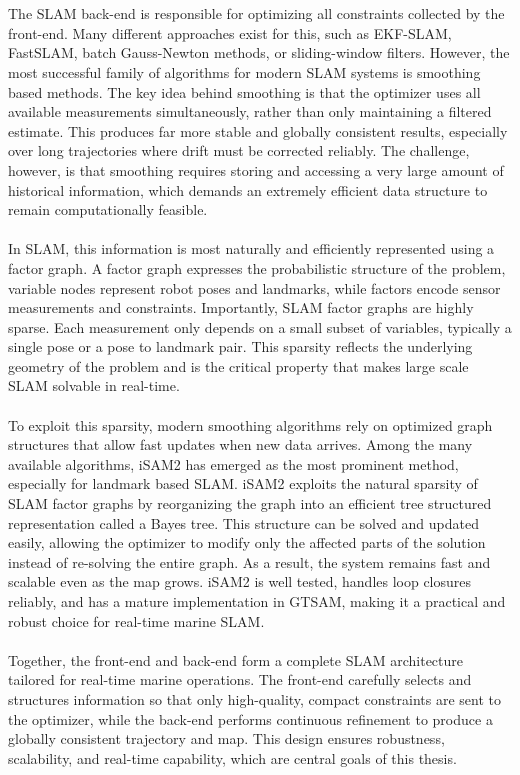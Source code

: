 \\ \\
The SLAM back-end is responsible for optimizing all constraints collected by the front-end. Many different approaches exist for this, such as EKF-SLAM, FastSLAM, batch Gauss-Newton methods, or sliding-window filters. However, the most successful family of algorithms for modern SLAM systems is smoothing based methods. The key idea behind smoothing is that the optimizer uses all available measurements simultaneously, rather than only maintaining a filtered estimate. This produces far more stable and globally consistent results, especially over long trajectories where drift must be corrected reliably. The challenge, however, is that smoothing requires storing and accessing a very large amount of historical information, which demands an extremely efficient data structure to remain computationally feasible.
\\ \\
In SLAM, this information is most naturally and efficiently represented using a factor graph. A factor graph expresses the probabilistic structure of the problem, variable nodes represent robot poses and landmarks, while factors encode sensor measurements and constraints. Importantly, SLAM factor graphs are highly sparse. Each measurement only depends on a small subset of variables, typically a single pose or a pose to landmark pair. This sparsity reflects the underlying geometry of the problem and is the critical property that makes large scale SLAM solvable in real-time.
\\ \\
To exploit this sparsity, modern smoothing algorithms rely on optimized graph structures that allow fast updates when new data arrives. Among the many available algorithms, iSAM2 has emerged as the most prominent method, especially for landmark based SLAM. iSAM2 exploits the natural sparsity of SLAM factor graphs by reorganizing the graph into an efficient tree structured representation called a Bayes tree. This structure can be solved and updated easily, allowing the optimizer to modify only the affected parts of the solution instead of re-solving the entire graph. As a result, the system remains fast and scalable even as the map grows. iSAM2 is well tested, handles loop closures reliably, and has a mature implementation in GTSAM, making it a practical and robust choice for real-time marine SLAM.
\\ \\
Together, the front-end and back-end form a complete SLAM architecture tailored for real-time marine operations. The front-end carefully selects and structures information so that only high-quality, compact constraints are sent to the optimizer, while the back-end performs continuous refinement to produce a globally consistent trajectory and map. This design ensures robustness, scalability, and real-time capability, which are central goals of this thesis.




